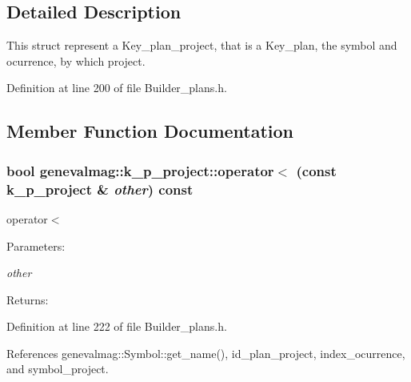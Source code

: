 \subsection{Detailed Description}
This struct represent a Key\_\-plan\_\-project, that is a Key\_\-plan, the symbol and ocurrence, by which project. 

Definition at line 200 of file Builder\_\-plans.h.

\subsection{Member Function Documentation}
\hypertarget{structgenevalmag_1_1k__p__project_4a06d269aa9b57fb5579757fad027c3f}{
\subsubsection[{operator$<$}]{\setlength{\rightskip}{0pt plus 5cm}bool genevalmag::k\_\-p\_\-project::operator$<$ (const {\bf k\_\-p\_\-project} \& {\em other}) const}}
\label{structgenevalmag_1_1k__p__project_4a06d269aa9b57fb5579757fad027c3f}


operator$<$ \begin{Desc}
\item[Parameters:]
\begin{description}
\item[{\em other}]\end{description}
\end{Desc}
\begin{Desc}
\item[Returns:]\end{Desc}


Definition at line 222 of file Builder\_\-plans.h.

References genevalmag::Symbol::get\_\-name(), id\_\-plan\_\-project, index\_\-ocurrence, and symbol\_\-project.

